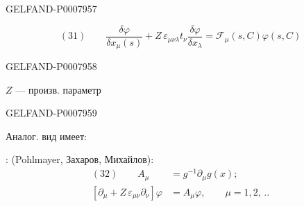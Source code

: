 \begin{GelfandAdjacentEvidence}{GELFAND-P000795}{7}


\[
(31)\qquad
\frac{\delta\varphi}{\delta x_\mu(s)}
+Z\,\varepsilon_{\mu\nu\lambda}t_\nu\frac{\delta\varphi}{\delta x_\lambda}
=\mathcal{F}_\mu(s,C)\varphi(s,C)
\]
\end{GelfandAdjacentEvidence}
\begin{GelfandAdjacentEvidence}{GELFAND-P000795}{8}


\(Z\) --- произв. параметр
\end{GelfandAdjacentEvidence}
\begin{GelfandAdjacentEvidence}{GELFAND-P000795}{9}


Аналог. вид имеет:

: (Pohlmayer, Захаров, Михайлов):
\[
\begin{aligned}
(32)\qquad A_\mu&=g^{-1}\partial_\mu g(x);\\
\left[\partial_\mu+Z\,\varepsilon_{\mu\nu}\partial_\nu\right]\varphi
&=A_\mu\varphi,\qquad\mu=1,2,\,..
\end{aligned}
\]
\end{GelfandAdjacentEvidence}



